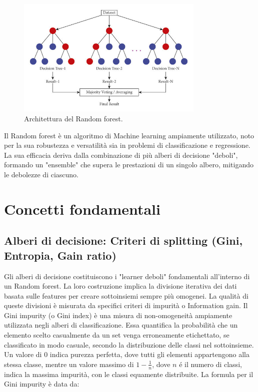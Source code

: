 \documentclass[a4paper,12pt]{report}
\begin{document}
	\begin{figure}[H]
		\centering
		\includegraphics[width=0.8\textwidth]{img/rf.png}
		\caption{Architettura del Random forest.}
	\end{figure}
	
	Il Random forest è un algoritmo di Machine learning ampiamente utilizzato, noto per la sua robustezza e versatilità sia in problemi di classificazione e regressione. La sua efficacia deriva dalla combinazione di più alberi di decisione "deboli", formando un "ensemble" che supera le prestazioni di un singolo albero, mitigando le debolezze di ciascuno.
	
	\section{Concetti fondamentali}
	
	\subsection{Alberi di decisione: Criteri di splitting (Gini, Entropia, Gain ratio)}
	
	Gli alberi di decisione costituiscono i "learner deboli" fondamentali all'interno di un Random forest. La loro costruzione implica la divisione iterativa dei dati basata sulle features per creare sottoinsiemi sempre più omogenei. La qualità di queste divisioni è misurata da specifici criteri di impurità o Information gain. Il Gini impurity (o Gini index) è una misura di non-omogeneità ampiamente utilizzata negli alberi di classificazione. Essa quantifica la probabilità che un elemento scelto casualmente da un set venga erroneamente etichettato, se classificato in modo casuale, secondo la distribuzione delle classi nel sottoinsieme. Un valore di 0 indica purezza perfetta, dove tutti gli elementi appartengono alla stessa classe, mentre un valore massimo di $1 - \frac{1}{n}$, dove $n$ é il numero di classi, indica la massima impurità, con le classi equamente distribuite. La formula per il Gini impurity è data da:
	
\end{document}
